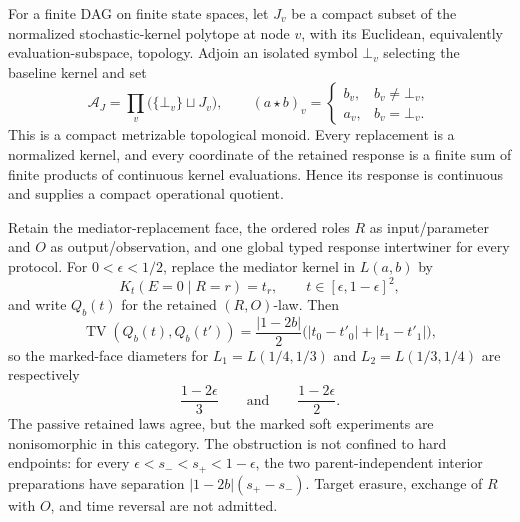 For a finite DAG on finite state spaces, let \(J_v\) be a compact subset of
the normalized stochastic-kernel polytope at node \(v\), with its Euclidean,
equivalently evaluation-subspace, topology.  Adjoin an isolated symbol
\(\bot_v\) selecting the baseline kernel and set
\begin{equation}
\mathcal A_J=\prod_v\bigl(\{\bot_v\}\sqcup J_v\bigr),
\qquad
(a\star b)_v=
\begin{cases}
b_v,&b_v\ne\bot_v,\\
a_v,&b_v=\bot_v.
\end{cases}
\label{eq:hist-normalized-soft-right-override}
\end{equation}
This is a compact metrizable topological monoid.  Every replacement is a
normalized kernel, and every coordinate of the retained response is a finite
sum of finite products of continuous kernel evaluations.  Hence its response
is continuous and
 supplies a compact operational
quotient.  

Retain the mediator-replacement face, the ordered roles \(R\) as
input/parameter and \(O\) as output/observation, and one global typed response
intertwiner for every protocol.  For \(0<\epsilon<1/2\), replace the mediator
kernel in \(L(a,b)\) by
\begin{equation}
K_t(E=0\mid R=r)=t_r,
\qquad
t\in[\epsilon,1-\epsilon]^2,
\label{eq:hist-soft-bsc-mediator-face}
\end{equation}
and write \(Q_b(t)\) for the retained \((R,O)\)-law.  Then
\begin{equation}
\operatorname{TV}\!\left(Q_b(t),Q_b(t')\right)
=\frac{|1-2b|}{2}\bigl(|t_0-t'_0|+|t_1-t'_1|\bigr),
\label{eq:hist-soft-bsc-tv}
\end{equation}
so the marked-face diameters for \(L_1=L(1/4,1/3)\) and
\(L_2=L(1/3,1/4)\) are respectively
\begin{equation}
\frac{1-2\epsilon}{3}
\qquad\text{and}\qquad
\frac{1-2\epsilon}{2}.
\label{eq:hist-soft-bsc-diameters}
\end{equation}
The passive retained laws agree, but the marked soft experiments are nonisomorphic in
this category.  The obstruction is not confined to hard endpoints: for every
\(\epsilon<s_-<s_+<1-\epsilon\), the two parent-independent interior
preparations have separation \(|1-2b|(s_+-s_-)\).  Target erasure, exchange
of \(R\) with \(O\), and time reversal are not admitted.  

